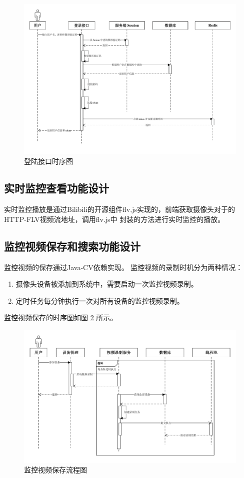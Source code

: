 \begin{figure}[ht]
    \centering
    \includegraphics[width=1\linewidth]{./Figure/IMG_login_seq.pdf}
    \caption{登陆接口时序图}\label{Fig:login_seq}
\end{figure}

\subsection{实时监控查看功能设计}
实时监控播放是通过Bilibili的开源组件flv.js实现的，前端获取摄像头对于的HTTP-FLV视频流地址，调用flv.js中
封装的方法进行实时监控的播放。

\subsection{监控视频保存和搜索功能设计}
监控视频的保存通过Java-CV依赖实现。
监控视频的录制时机分为两种情况：

\begin{enumerate}
    \item 摄像头设备被添加到系统中，需要启动一次监控视频录制。
    \item 定时任务每分钟执行一次对所有设备的监控视频录制。
\end{enumerate}

监控视频保存的时序图如图 \ref{Fig:video_save} 所示。

\newpage
\begin{figure}[ht]
    \centering
    \includegraphics[width=.9\linewidth]{./Figure/IMG_video_save.pdf}
    \caption{监控视频保存流程图}\label{Fig:video_save}
\end{figure}

